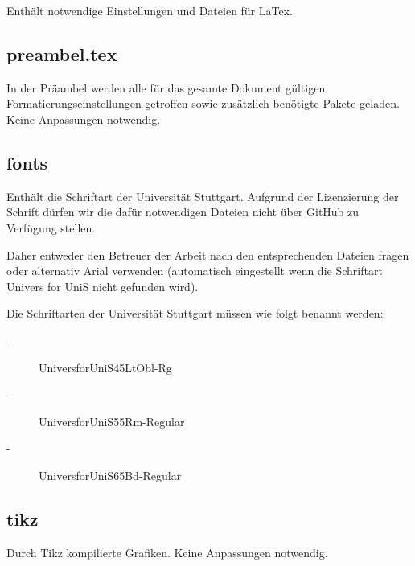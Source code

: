 Enthält notwendige Einstellungen und Dateien für LaTex.

\subsection*{preambel.tex}

In der Präambel werden alle für das gesamte Dokument gültigen Formatierungseinstellungen getroffen sowie zusätzlich benötigte Pakete geladen. Keine Anpassungen notwendig.

\subsection*{fonts}
Enthält die Schriftart der Universität Stuttgart. Aufgrund der Lizenzierung der Schrift dürfen wir die dafür notwendigen Dateien nicht über GitHub zu Verfügung stellen. 

Daher entweder den Betreuer der Arbeit nach den entsprechenden Dateien fragen oder alternativ Arial verwenden (automatisch eingestellt wenn die Schriftart Univers for UniS nicht gefunden wird).

Die Schriftarten der Universität Stuttgart müssen wie folgt benannt werden:

\begin{description}
	\item[-] UniversforUniS45LtObl-Rg
	\item[-] UniversforUniS55Rm-Regular
	\item[-] UniversforUniS65Bd-Regular
\end{description}

\subsection*{tikz}
Durch Tikz kompilierte Grafiken. Keine Anpassungen notwendig.